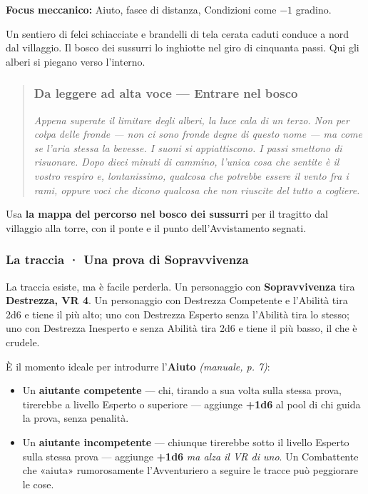 \documentclass[10pt,a4paper]{article}
\newcommand{\tightlist}{\setlength{\itemsep}{0pt}\setlength{\parskip}{0pt}}
\begin{document}
\textbf{Focus meccanico:} Aiuto, fasce di distanza, Condizioni come $-1$ gradino.

Un sentiero di felci schiacciate e brandelli di tela cerata caduti conduce a nord dal villaggio. Il bosco dei sussurri lo inghiotte nel giro di cinquanta passi. Qui gli alberi si piegano verso l'interno.

\begin{quote}
\subsubsection{Da leggere ad alta voce --- Entrare nel bosco}\label{da-leggere-entrare-nel-bosco}

\emph{Appena superate il limitare degli alberi, la luce cala di un terzo. Non per colpa delle fronde --- non ci sono fronde degne di questo nome --- ma come se l'aria stessa la bevesse. I suoni si appiattiscono. I passi smettono di risuonare. Dopo dieci minuti di cammino, l'unica cosa che sentite è il vostro respiro e, lontanissimo, qualcosa che potrebbe essere il vento fra i rami, oppure voci che dicono qualcosa che non riuscite del tutto a cogliere.}
\end{quote}

Usa \textbf{la mappa del percorso nel bosco dei sussurri} per il tragitto dal villaggio alla torre, con il ponte e il punto dell'Avvistamento segnati.

\subsubsection{La traccia · Una prova di Sopravvivenza}\label{la-traccia-una-prova-di-sopravvivenza}

La traccia esiste, ma è facile perderla. Un personaggio con \textbf{Sopravvivenza} tira \textbf{Destrezza, VR 4}. Un personaggio con Destrezza Competente e l'Abilità tira 2d6 e tiene il più alto; uno con Destrezza Esperto senza l'Abilità tira lo stesso; uno con Destrezza Inesperto e senza Abilità tira 2d6 e tiene il più basso, il che è crudele.

È il momento ideale per introdurre l'\textbf{Aiuto} \emph{(manuale, p. 7)}:

\begin{itemize}
\tightlist
\item
  Un \textbf{aiutante competente} --- chi, tirando a sua volta sulla stessa prova, tirerebbe a livello Esperto o superiore --- aggiunge \textbf{+1d6} al pool di chi guida la prova, senza penalità.
\item
  Un \textbf{aiutante incompetente} --- chiunque tirerebbe sotto il livello Esperto sulla stessa prova --- aggiunge \textbf{+1d6} \emph{ma alza il VR di uno}. Un Combattente che «aiuta» rumorosamente l'Avventuriero a seguire le tracce può peggiorare le cose.
\end{itemize}
\end{document}
